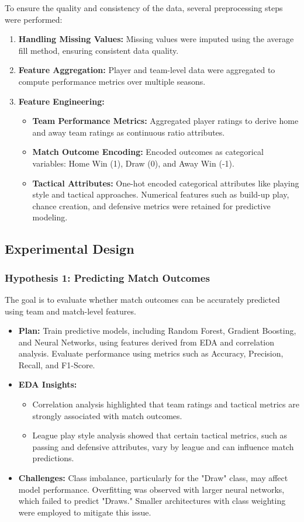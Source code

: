 \documentclass{article}
\begin{document}
To ensure the quality and consistency of the data, several preprocessing steps were performed:
\begin{enumerate}
    \item \textbf{Handling Missing Values:} Missing values were imputed using the average fill method, ensuring consistent data quality.
    \item \textbf{Feature Aggregation:} Player and team-level data were aggregated to compute performance metrics over multiple seasons.
    \item \textbf{Feature Engineering:}
    \begin{itemize}
        \item \textbf{Team Performance Metrics:} Aggregated player ratings to derive home and away team ratings as continuous ratio attributes.
        \item \textbf{Match Outcome Encoding:} Encoded outcomes as categorical variables: Home Win (1), Draw (0), and Away Win (-1).
        \item \textbf{Tactical Attributes:} One-hot encoded categorical attributes like playing style and tactical approaches. Numerical features such as build-up play, chance creation, and defensive metrics were retained for predictive modeling.
    \end{itemize}
\end{enumerate}

\subsection{Experimental Design}

\subsubsection{Hypothesis 1: Predicting Match Outcomes}
The goal is to evaluate whether match outcomes can be accurately predicted using team and match-level features.
\begin{itemize}
    \item \textbf{Plan:} Train predictive models, including Random Forest, Gradient Boosting, and Neural Networks, using features derived from EDA and correlation analysis. Evaluate performance using metrics such as Accuracy, Precision, Recall, and F1-Score.
    \item \textbf{EDA Insights:} 
    \begin{itemize}
        \item Correlation analysis highlighted that team ratings and tactical metrics are strongly associated with match outcomes.
        \item League play style analysis showed that certain tactical metrics, such as passing and defensive attributes, vary by league and can influence match predictions.
    \end{itemize}
    \item \textbf{Challenges:} Class imbalance, particularly for the "Draw" class, may affect model performance. Overfitting was observed with larger neural networks, which failed to predict "Draws." Smaller architectures with class weighting were employed to mitigate this issue.
\end{itemize}
\end{document}

